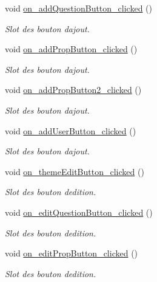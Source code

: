 \begin{DoxyCompactItemize}
void \mbox{\hyperlink{classManageWindow_a5f84c69a12caf2a8b934b5ed59a30f88}{on\+\_\+add\+Question\+Button\+\_\+clicked}} ()
\begin{DoxyCompactList}\small\item\em Slot des bouton d\textquotesingle{}ajout. \end{DoxyCompactList}\item 
void \mbox{\hyperlink{classManageWindow_a28475c18e491f3e388747685731e5111}{on\+\_\+add\+Prop\+Button\+\_\+clicked}} ()
\begin{DoxyCompactList}\small\item\em Slot des bouton d\textquotesingle{}ajout. \end{DoxyCompactList}\item 
void \mbox{\hyperlink{classManageWindow_a7b65c7bb9f7d022d57575db22a8e8e00}{on\+\_\+add\+Prop\+Button2\+\_\+clicked}} ()
\begin{DoxyCompactList}\small\item\em Slot des bouton d\textquotesingle{}ajout. \end{DoxyCompactList}\item 
void \mbox{\hyperlink{classManageWindow_a741f69a15264a0b10767cc89522ecaf9}{on\+\_\+add\+User\+Button\+\_\+clicked}} ()
\begin{DoxyCompactList}\small\item\em Slot des bouton d\textquotesingle{}ajout. \end{DoxyCompactList}\item 
void \mbox{\hyperlink{classManageWindow_aed7adfd94929cb522de43f1aa3314483}{on\+\_\+theme\+Edit\+Button\+\_\+clicked}} ()
\begin{DoxyCompactList}\small\item\em Slot des bouton d\textquotesingle{}edition. \end{DoxyCompactList}\item 
void \mbox{\hyperlink{classManageWindow_a302b93485498f6bfbe5c362298222620}{on\+\_\+edit\+Question\+Button\+\_\+clicked}} ()
\begin{DoxyCompactList}\small\item\em Slot des bouton d\textquotesingle{}edition. \end{DoxyCompactList}\item 
void \mbox{\hyperlink{classManageWindow_a5ca2c828847bf13c40699128cc061171}{on\+\_\+edit\+Prop\+Button\+\_\+clicked}} ()
\begin{DoxyCompactList}\small\item\em Slot des bouton d\textquotesingle{}edition. \end{DoxyCompactList}\item 

\end{DoxyCompactItemize}
